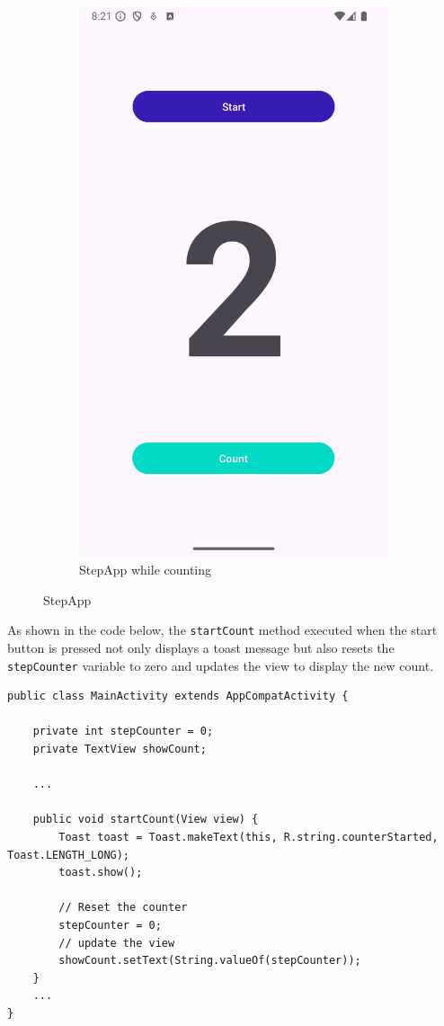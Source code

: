 \documentclass{usireport}
\begin{document}
\begin{figure}[H]
\begin{subfigure}{0.4\textwidth}
        \includegraphics[width=0.65\linewidth]{fig/stepapp_count.png}
        \caption{StepApp while counting}
        \label{fig:stepapp_count}
    \end{subfigure}
    \caption{StepApp}
    \label{fig:stepapp}
\end{figure}


As shown in the code below, the \texttt{startCount} method executed when the start button is pressed not only displays a toast message but also resets the \texttt{stepCounter} variable to zero and updates the view to display the new count.

\begin{verbatim} 
public class MainActivity extends AppCompatActivity {

    private int stepCounter = 0;
    private TextView showCount;

    ...

    public void startCount(View view) {
        Toast toast = Toast.makeText(this, R.string.counterStarted, Toast.LENGTH_LONG);
        toast.show();

        // Reset the counter
        stepCounter = 0;
        // update the view
        showCount.setText(String.valueOf(stepCounter));
    }
    ...
}
\end{verbatim}
\end{document}
